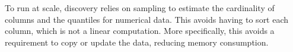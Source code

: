 %
%
%
%
%


To run at scale, discovery relies on sampling to estimate the cardinality of
columns and the quantiles for numerical data. This avoids having to sort each
column, which is not a linear computation.  More specifically, this avoids a
requirement to copy or update the data, reducing memory consumption.

